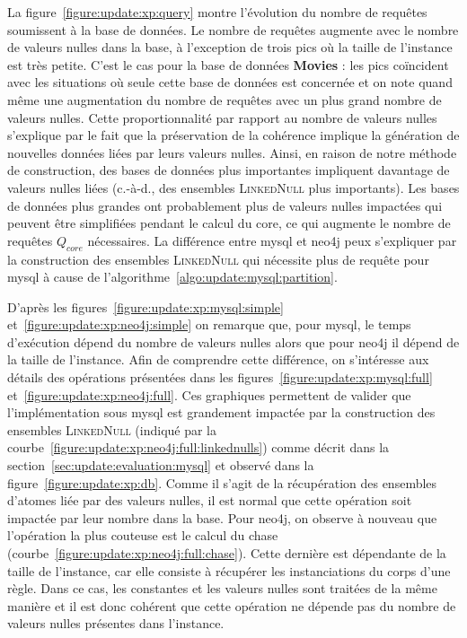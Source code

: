 La figure~\ref{figure:update:xp:query} montre l'évolution du nombre de requêtes soumissent à la base de données.
Le nombre de requêtes augmente avec le nombre de valeurs nulles dans la base, à l'exception de trois pics où la taille de l'instance est très petite.
C'est le cas pour la base de données \textbf{Movies} : les pics coïncident avec les situations où seule cette base de données est concernée et on note quand même une augmentation du nombre de requêtes avec un plus grand nombre de valeurs nulles.
Cette proportionnalité par rapport au nombre de valeurs nulles s'explique par le fait que la préservation de la cohérence implique la génération de nouvelles données liées par leurs valeurs nulles.
Ainsi, en raison de notre méthode de construction, des bases de données plus importantes impliquent davantage de valeurs nulles liées (c.-à-d., des ensembles \textsc{LinkedNull} plus importants).
Les bases de données plus grandes ont probablement plus de valeurs nulles impactées qui peuvent être simplifiées pendant le calcul du \gls{core}, ce qui augmente le nombre de requêtes $Q_{core}$ nécessaires.
La différence entre \gls{mysql} et \gls{neo4j} peux s'expliquer par la construction des ensembles \textsc{LinkedNull} qui nécessite plus de requête pour \gls{mysql} à cause de l'algorithme~\ref{algo:update:mysql:partition}.

D'après les figures~\ref{figure:update:xp:mysql:simple} et~\ref{figure:update:xp:neo4j:simple} on remarque que, pour \gls{mysql}, le temps d'exécution dépend du nombre de valeurs nulles alors que pour \gls{neo4j} il dépend de la taille de l'instance.
Afin de comprendre cette différence, on s'intéresse aux détails des opérations présentées dans les figures~\ref{figure:update:xp:mysql:full} et~\ref{figure:update:xp:neo4j:full}.
Ces graphiques permettent de valider que l'implémentation sous \gls{mysql} est grandement impactée par la construction des ensembles \textsc{LinkedNull} (indiqué par la courbe~\ref{figure:update:xp:neo4j:full:linkednulls}) comme décrit dans la section~\ref{sec:update:evaluation:mysql} et observé dans la figure~\ref{figure:update:xp:db}.
Comme il s'agit de la récupération des ensembles d'atomes liée par des valeurs nulles, il est normal que cette opération soit impactée par leur nombre dans la base.
Pour \gls{neo4j}, on observe à nouveau que l'opération la plus couteuse est le calcul du \gls{chase} (courbe~\ref{figure:update:xp:neo4j:full:chase}).
Cette dernière est dépendante de la taille de l'instance, car elle consiste à récupérer les instanciations du corps d'une règle.
Dans ce cas, les constantes et les valeurs nulles sont traitées de la même manière et il est donc cohérent que cette opération ne dépende pas du nombre de valeurs nulles présentes dans l'instance.

